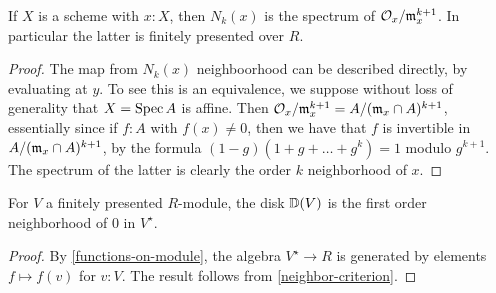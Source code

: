 \begin{lemma}\label{nbhd-is-spec}
If $X$ is a scheme with $x : X$, then $N_k(x)$ is the
spectrum of $\mathcal{O}_x / \mathfrak{m}_x^{k+1}$. In particular the latter is finitely presented
over $R$.
\end{lemma}
\begin{proof}
The map from $N_k(x)$ neighboorhood can be described directly, by evaluating
at $y$. To see this is an equivalence, we suppose without loss of generality that
$X = \operatorname{Spec} A$ is affine. Then $\mathcal{O}_x / \mathfrak{m}_x^{k+1} = A / (\mathfrak{m}_x \cap A)^{k+1}$,
essentially since if $f : A$ with $f(x) \ne 0$, then we have that
$f$ is invertible in $A / (\mathfrak{m}_x \cap A)^{k+1}$, by the formula
$(1 - g)(1 + g + \ldots + g^k) = 1$ modulo $g^{k+1}$.
The spectrum of the latter is clearly the order $k$ neighborhood of $x$.
\end{proof}

\begin{lemma}
For $V$ a finitely presented $R$-module, the disk $\mathbb{D}(V)$ is the
first order neighborhood of $0$ in $V^\star$.
\end{lemma}
\begin{proof}
By \cref{functions-on-module}, the algebra $V^\star \to R$ is generated by
elements $f \mapsto f(v)$ for $v : V$. The result follows from \cref{neighbor-criterion}.
\end{proof}

